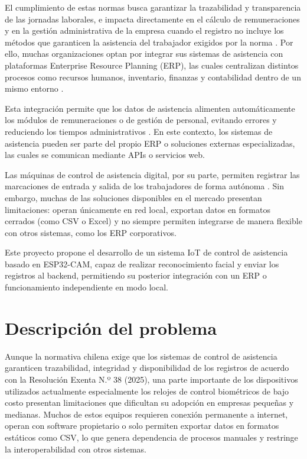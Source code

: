 \documentclass{iccmemoria}
\begin{document}
El cumplimiento de estas normas busca garantizar la trazabilidad y transparencia de las jornadas laborales, e impacta directamente en el cálculo de remuneraciones y en la gestión administrativa de la empresa cuando el registro no incluye los métodos que garanticen la asistencia del trabajador exigidos por la norma \cite{defontana_resolucion38}. Por ello, muchas organizaciones optan por integrar sus sistemas de asistencia con plataformas Enterprise Resource Planning (ERP), las cuales centralizan distintos procesos como recursos humanos, inventario, finanzas y contabilidad dentro de un mismo entorno \cite{apd_erp}.

Esta integración permite que los datos de asistencia alimenten automáticamente los módulos de remuneraciones o de gestión de personal, evitando errores y reduciendo los tiempos administrativos \cite{geovictoria_erp}. En este contexto, los sistemas de asistencia pueden ser parte del propio ERP o soluciones externas especializadas, las cuales se comunican mediante APIs o servicios web.

Las máquinas de control de asistencia digital, por su parte, permiten registrar las marcaciones de entrada y salida de los trabajadores de forma autónoma \cite{nubox_relojcontrol}. Sin embargo, muchas de las soluciones disponibles en el mercado presentan limitaciones: operan únicamente en red local, exportan datos en formatos cerrados (como CSV o Excel) y no siempre permiten integrarse de manera flexible con otros sistemas, como los ERP corporativos.

Este proyecto propone el desarrollo de un sistema IoT de control de asistencia basado en ESP32-CAM, capaz de realizar reconocimiento facial y enviar los registros al backend, permitiendo su posterior integración con un ERP o funcionamiento independiente en modo local.


\section{Descripción del problema}
Aunque la normativa chilena exige que los sistemas de control de asistencia garanticen trazabilidad, integridad y disponibilidad de los registros de acuerdo con la Resolución Exenta N.º 38 (2025), una parte importante de los dispositivos utilizados actualmente especialmente los relojes de control biométricos de bajo costo presentan limitaciones que dificultan su adopción en empresas pequeñas y medianas. Muchos de estos equipos requieren conexión permanente a internet, operan con software propietario o solo permiten exportar datos en formatos estáticos como CSV, lo que genera dependencia de procesos manuales y restringe la interoperabilidad con otros sistemas.
\end{document}
